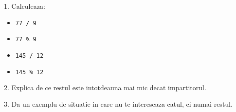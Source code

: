 \begin{solobox}
  1. Calculeaza:
  \begin{itemize}
    \item \texttt{77 / 9}
    \item \texttt{77 \% 9}
    \item \texttt{145 / 12}
    \item \texttt{145 \% 12}
  \end{itemize}

  2. Explica de ce restul este intotdeauna mai mic decat impartitorul.

  3. Da un exemplu de situatie in care nu te intereseaza catul, ci numai restul.
\end{solobox}
